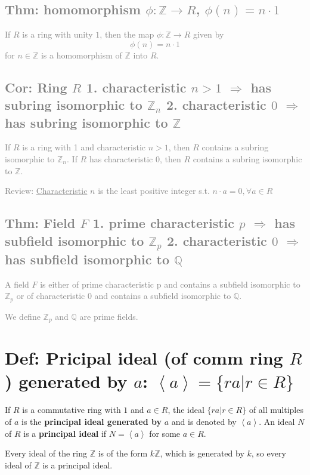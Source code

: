 \documentclass[11pt]{elegantbook}
\begin{document}
\textcolor{gray}{
\section{Thm: homomorphism $\phi:\mathbb{Z} \rightarrow R$, $\phi(n)=n\cdot 1$}
\begin{theorem}
    If $R$ is a ring with unity $1$, then the map $\phi:\mathbb{Z} \rightarrow R$ given by
    $$\phi(n)=n\cdot 1$$
    for $n\in \mathbb{Z}$ is a homomorphism of $\mathbb{Z}$ into $R$.
\end{theorem}
\subsection{Cor: Ring $R$ 1. characteristic $n > 1$ $\Rightarrow$ has subring isomorphic
to $\mathbb{Z}_n$ 2. characteristic $0$ $\Rightarrow$ has subring isomorphic
to $\mathbb{Z}$}
\begin{corollary}
    If $R$ is a ring with 1 and characteristic $n > 1$, then $R$ contains a subring isomorphic
    to $\mathbb{Z}_n$. If $R$ has characteristic $0$, then $R$ contains a subring isomorphic to $\mathbb{Z}$.
\end{corollary}
Review: \underline{Characteristic} $n$ is the least positive integer s.t. $n\cdot a=0,\forall a\in R$
\subsection{Thm: Field $F$ 1. prime characteristic $p$ $\Rightarrow$ has subfield isomorphic to $\mathbb{Z}_p$ 2. characteristic $0$ $\Rightarrow$ has subfield isomorphic
to $\mathbb{Q}$}
\begin{theorem}
    A field $F$ is either of prime characteristic p and contains a subfield isomorphic to $\mathbb{Z}_p$ or of characteristic $0$ and contains a subfield isomorphic to $\mathbb{Q}$.
\end{theorem}
\begin{definition}
    We define $\mathbb{Z}_p$ and $\mathbb{Q}$ are prime fields.
\end{definition}}

\section{Def: Pricipal ideal (of comm ring $R$) generated by $a$: $\left\langle a\right\rangle=\{ra|r\in R\}$}
\begin{definition}
    If $R$ is a commutative ring with $1$ and $a\in R$, the ideal $\{ra\vert r\in R\}$ of all multiples of $a$ is the \textbf{principal ideal generated by} $a$ and is denoted by $\left\langle a\right\rangle$. An ideal $N$ of $R$ is a \textbf{principal ideal} if $N=\left\langle a\right\rangle$ for some $a\in R$.
\end{definition}
\begin{example}
    Every ideal of the ring $\mathbb{Z}$ is of the form $k \mathbb{Z}$, which is generated by $k$, so every ideal of $\mathbb{Z}$ is a principal ideal.
\end{example}
\end{document}
